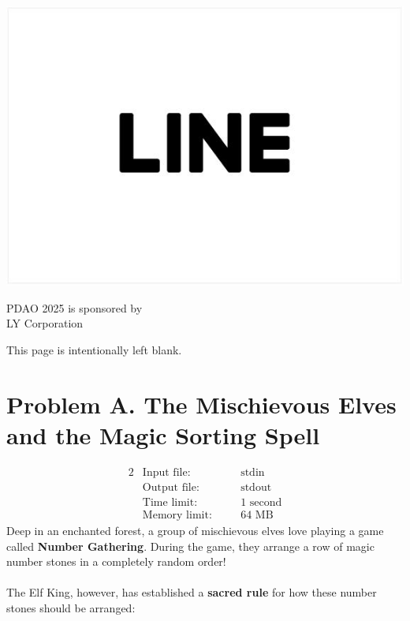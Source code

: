 \documentclass[12pt,a4paper]{article}
\newcommand*{\blankpage}{%
\vspace*{\fill}
{\centering \huge This page is intentionally left blank.\par}
\vspace{\fill}}
\begin{document}
\begin{center}
\begin{minipage}{0.35\textwidth}
    \includegraphics[width=\linewidth]{Line.png}
\end{minipage}
\begin{minipage}{0.35\textwidth}
    PDAO 2025 is sponsored by \\ \textcopyright \space LY Corporation
\end{minipage}
\end{center}

\blankpage

\newpage
\section*{\fontsize{18}{12}Problem A. The Mischievous Elves and the Magic Sorting Spell}

\begin{alignat*} {2}
 &   \text{Input file:}   \quad     &&\text{stdin}\\
 &   \text{Output file:}  \quad     &&\text{stdout}\\
 &   \text{Time limit:}   \quad     &&\text{1 second}\\
 &   \text{Memory limit:} \quad     &&\text{64 MB}
\end{alignat*}
\noindent
Deep in an enchanted forest, a group of mischievous elves love playing a game called \textbf{Number Gathering}. During the game, they arrange a row of magic number stones in a completely random order!
\\\\
\noindent
The Elf King, however, has established a \textbf{sacred rule} for how these number stones should be arranged:
\end{document}
